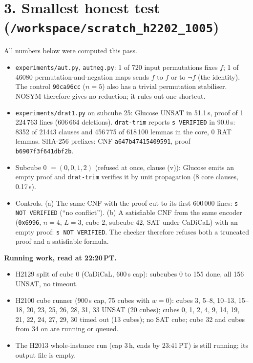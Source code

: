 \documentclass[11pt]{article}
\begin{document}
\section*{3. Smallest honest test (\texttt{/workspace/scratch\_h2202\_1005})}
All numbers below were computed this pass.
\begin{itemize}
\item \texttt{experiments/aut.py}, \texttt{autneg.py}: 1 of 720 input permutations fixes $f$; 1 of 46080 permutation-and-negation maps sends $f$ to $f$ or to $\neg f$ (the identity). The control \texttt{90ca96cc} ($n=5$) also has a trivial permutation stabiliser. NOSYM therefore gives no reduction; it rules out one shortcut.
\item \texttt{experiments/drat1.py} on subcube 25: Glucose UNSAT in 51.1\,s, proof of 1\,224\,763 lines (606\,664 deletions). \texttt{drat-trim} reports \texttt{s VERIFIED} in 90.0\,s: 8352 of 21443 clauses and 456\,775 of 618\,100 lemmas in the core, 0 RAT lemmas. SHA-256 prefixes: CNF \texttt{a647b47415409591}, proof \texttt{b6907f3f641dbf2b}.
\item Subcube 0 $=(0,0,1,2)$ (refused at once, clause (v)): Glucose emits an empty proof and \texttt{drat-trim} verifies it by unit propagation (8 core clauses, 0.17\,s).
\item Controls. (a) The same CNF with the proof cut to its first 600\,000 lines: \texttt{s NOT VERIFIED} (``no conflict''). (b) A satisfiable CNF from the same encoder (\texttt{0x6996}, $n=4$, $L=3$, cube 2, subcube 42, SAT under CaDiCaL) with an empty proof: \texttt{s NOT VERIFIED}. The checker therefore refuses both a truncated proof and a satisfiable formula.
\end{itemize}

\textbf{Running work, read at 22:20\,PT.}
\begin{itemize}
\item H2129 split of cube 0 (CaDiCaL, 600\,s cap): subcubes 0 to 155 done, all 156 UNSAT, no timeout.
\item H2100 cube runner (900\,s cap, 75 cubes with $w=0$): cubes 3, 5--8, 10--13, 15--18, 20, 23, 25, 26, 28, 31, 33 UNSAT (20 cubes); cubes 0, 1, 2, 4, 9, 14, 19, 21, 22, 24, 27, 29, 30 timed out (13 cubes); no SAT cube; cube 32 and cubes from 34 on are running or queued.
\item The H2013 whole-instance run (cap 3\,h, ends by 23:41\,PT) is still running; its output file is empty.
\end{itemize}
\end{document}
